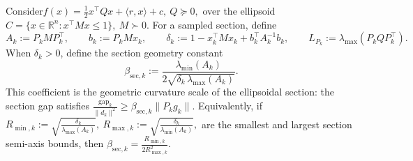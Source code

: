 \documentclass{article}
\begin{document}
Consider$
f(x)=\frac12x^\top Qx+\langle r,x\rangle+c,\  Q\succeq0,$
over the ellipsoid $C=\{x\in\mathbb R^n:x^\top Mx\le1\},\ M\succ0.$ For a sampled section, define
\[
A_k:=P_kMP_k^\top,
\qquad
b_k:=P_kMx_k,
\qquad
\delta_k:=1-x_k^\top Mx_k+b_k^\top A_k^{-1}b_k,
\qquad
L_{P_k}:=\lambda_{\max}(P_kQP_k^\top).
\]
When \(\delta_k>0\), define the section geometry constant
\begin{equation}
\beta_{\mathrm{sec},k}
:=
\frac{\lambda_{\min}(A_k)}
{2\sqrt{\delta_k\,\lambda_{\max}(A_k)}}.
\label{eq:beta_sec_k_main}
\end{equation}
This coefficient is the geometric curvature scale of the ellipsoidal section:
the section gap satisfies
$
\frac{\mathrm{gap}_k}{\|d_k\|^2}
\ge
\beta_{\mathrm{sec},k}\|P_kg_k\|.
$
Equivalently, if
$
R_{\min,k}:=\sqrt{\frac{\delta_k}{\lambda_{\max}(A_k)}},
\ 
R_{\max,k}:=\sqrt{\frac{\delta_k}{\lambda_{\min}(A_k)}},
$
are the smallest and largest section semi-axis bounds, then
$
\beta_{\mathrm{sec},k}
=
\frac{R_{\min,k}}{2R_{\max,k}^2}.$
\end{document}
